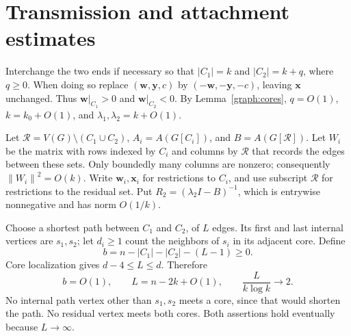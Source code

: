 \documentclass[11pt,a4paper]{article}
\numberwithin{equation}{section}
\theoremstyle{definition}
\theoremstyle{remark}
\newcommand{\norm}[1]{\left\lVert#1\right\rVert}
\begin{document}
\section{Transmission and attachment estimates}
\label{sec:graph-attachments}

Interchange the two ends if necessary so that $|C_1|=k$ and
$|C_2|=k+q$, where $q\ge0$. When doing so replace
$(\mathbf w,\mathbf y,c)$ by $(-\mathbf w,-\mathbf y,-c)$, leaving
$\mathbf x$ unchanged. Thus $\mathbf w|_{C_1}>0$ and
$\mathbf w|_{C_2}<0$. By Lemma~\ref{graph:cores}, $q=O(1)$,
$k=k_0+O(1)$, and $\lambda_1,\lambda_2=k+O(1)$.

Let $\mathcal R=V(G)\setminus(C_1\cup C_2)$,
$A_i=A(G[C_i])$, and $B=A(G[\mathcal R])$.
Let $W_i$ be the matrix with rows indexed by $C_i$ and columns by
$\mathcal R$ that records the edges between these sets. Only boundedly
many columns are nonzero; consequently $\norm{W_i}^2=O(k)$.
Write $\mathbf w_i,\mathbf x_i$ for restrictions to $C_i$, and use
subscript $\mathcal R$ for restrictions to the residual set. Put
$R_2=(\lambda_2I-B)^{-1}$, which is entrywise nonnegative and has norm
$O(1/k)$.

Choose a shortest path between $C_1$ and $C_2$, of $L$ edges. Its first
and last internal vertices are $s_1,s_2$; let $d_i\ge1$ count the
neighbors of $s_i$ in its adjacent core. Define
\begin{equation}\label{graph:exception-count}
 b=n-|C_1|-|C_2|-(L-1)\ge0.
\end{equation}
Core localization gives $d-4\le L\le d$. Therefore
\begin{equation}\label{graph:corridor-scale}
 b=O(1),\qquad L=n-2k+O(1),\qquad
 \frac{L}{k\log k}\longrightarrow2.
\end{equation}
No internal path vertex other than $s_1,s_2$ meets a core, since that
would shorten the path. No residual vertex meets both cores. Both
assertions hold eventually because $L\to\infty$.
\end{document}
